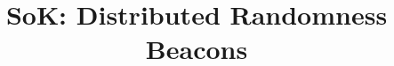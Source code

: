 


\title{SoK: Distributed Randomness Beacons}



\maketitle
\thispagestyle{plain}
\pagestyle{plain}
\begin{abstract}

\end{abstract}











\pagebreak

\appendix




